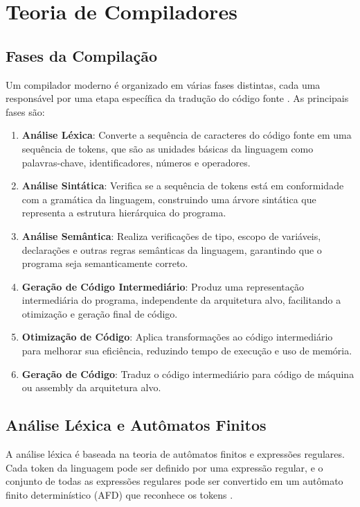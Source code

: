 \documentclass[
	12pt,				%
	oneside,
	a4paper,			%
	english,			%
	french,				%
	spanish,			%
	brazil,				%
	]{abntex2}
\begin{document}
\section{Teoria de Compiladores}

\subsection{Fases da Compilação}
Um compilador moderno é organizado em várias fases distintas, cada uma responsável por uma etapa específica da tradução do código fonte \cite{Aho2007}. As principais fases são:

\begin{enumerate}
    \item \textbf{Análise Léxica}: Converte a sequência de caracteres do código fonte em uma sequência de tokens, que são as unidades básicas da linguagem como palavras-chave, identificadores, números e operadores.
    
    \item \textbf{Análise Sintática}: Verifica se a sequência de tokens está em conformidade com a gramática da linguagem, construindo uma árvore sintática que representa a estrutura hierárquica do programa.
    
    \item \textbf{Análise Semântica}: Realiza verificações de tipo, escopo de variáveis, declarações e outras regras semânticas da linguagem, garantindo que o programa seja semanticamente correto.
    
    \item \textbf{Geração de Código Intermediário}: Produz uma representação intermediária do programa, independente da arquitetura alvo, facilitando a otimização e geração final de código.
    
    \item \textbf{Otimização de Código}: Aplica transformações ao código intermediário para melhorar sua eficiência, reduzindo tempo de execução e uso de memória.
    
    \item \textbf{Geração de Código}: Traduz o código intermediário para código de máquina ou assembly da arquitetura alvo.
\end{enumerate}

\subsection{Análise Léxica e Autômatos Finitos}
A análise léxica é baseada na teoria de autômatos finitos e expressões regulares. Cada token da linguagem pode ser definido por uma expressão regular, e o conjunto de todas as expressões regulares pode ser convertido em um autômato finito determinístico (AFD) que reconhece os tokens \cite{Sipser2012}.
\end{document}
